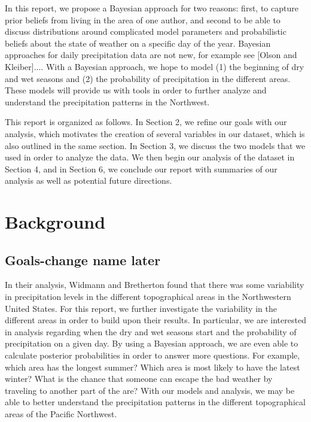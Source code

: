 \documentclass{article}
\begin{document}
In this report, we propose a Bayesian approach for two reasons: first, to capture prior beliefs  from living in the area of one author, and second to be able to discuss distributions around complicated model parameters and probabilistic beliefs about the state of weather on a specific day of the year. Bayesian approaches for daily precipitation data are not new, for example see [Olson and Kleiber].... With a Bayesian approach, we hope to model (1) the beginning of dry and wet seasons and (2) the probability of precipitation in the different areas. These models will provide us with tools in order to further analyze and understand the precipitation patterns in the Northwest. 

This report is organized as follows. In Section 2, we refine our goals with our analysis, which motivates the creation of several variables in our dataset, which is also outlined in the same section. In Section 3, we discuss the two models that we used in order to analyze the data.  We then begin our analysis of the dataset in Section 4, and in Section 6, we conclude our report with summaries of our analysis as well as potential future directions.

\section{Background}

\subsection{Goals-change name later}
In their analysis, Widmann and Bretherton found that there was some variability in precipitation levels in the different topographical areas in the Northwestern United States. For this report, we further investigate the variability in the different areas in order to build upon their results. In particular, we are interested in analysis regarding when the dry and wet seasons start and the probability of precipitation on a given day. By using a Bayesian approach, we are even able to calculate posterior probabilities in order to answer more questions. For example, which area has the longest summer? Which area is most likely to have the latest winter?  What is the chance that someone can escape the bad weather by traveling to another part of the are? With our models and analysis, we may be able to better understand the precipitation patterns in the different topographical areas of the Pacific Northwest. 
\end{document}
